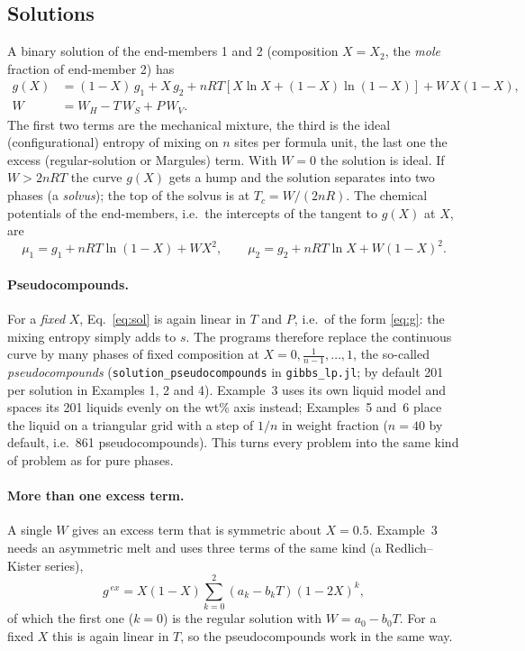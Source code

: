 \documentclass[11pt,a4paper]{article}
\newcommand{\file}[1]{\texttt{#1}}
\begin{document}
\subsection{Solutions}
A binary solution of the end-members 1 and 2 (composition $X = X_2$, the \emph{mole} fraction of
end-member 2) has
\begin{equation}\label{eq:sol}
\begin{aligned}
  g(X) &= (1-X)\,g_1 + X\,g_2 + n R T\left[X\ln X + (1-X)\ln(1-X)\right] + W\,X(1-X),\\
  W &= W_H - T\,W_S + P\,W_V .
\end{aligned}
\end{equation}
The first two terms are the mechanical mixture, the third is the ideal (configurational) entropy of mixing
on $n$ sites per formula unit, the last one the excess (regular-solution or Margules) term. With $W=0$ the
solution is ideal. If $W > 2nRT$ the curve $g(X)$ gets a hump and the solution separates into two phases
(a \emph{solvus}); the top of the solvus is at $T_c = W/(2nR)$. The chemical potentials of the end-members,
i.e.\ the intercepts of the tangent to $g(X)$ at $X$, are
\begin{equation}\label{eq:mu}
  \mu_1 = g_1 + nRT\ln(1-X) + W X^2,\qquad \mu_2 = g_2 + nRT\ln X + W(1-X)^2 .
\end{equation}

\paragraph{Pseudocompounds.} For a \emph{fixed} $X$, Eq.~\eqref{eq:sol} is again linear in $T$ and $P$, i.e.\ of
the form \eqref{eq:g}: the mixing entropy simply adds to $s$. The programs therefore replace the continuous
curve by many phases of fixed composition at $X = 0, \tfrac{1}{n-1}, \dots, 1$, the so-called
\emph{pseudocompounds} (\lstinline{solution_pseudocompounds} in \file{gibbs\_lp.jl}; by default 201 per
solution in Examples 1, 2 and 4). Example~3 uses its own liquid model and spaces its 201 liquids evenly on
the wt\% axis instead; Examples~5 and~6 place the liquid on a triangular grid with a step of $1/n$ in weight
fraction ($n = 40$ by default, i.e.\ 861 pseudocompounds).
This turns every problem into the same kind of problem as for pure phases.

\paragraph{More than one excess term.} A single $W$ gives an excess term that is symmetric about $X = 0.5$.
Example~3 needs an asymmetric melt and uses three terms of the same kind (a Redlich–Kister series),
\begin{equation}\label{eq:rk}
  g^{\,ex} = X(1-X)\sum_{k=0}^{2} \left(a_k - b_k T\right)(1-2X)^k ,
\end{equation}
of which the first one ($k=0$) is the regular solution with $W = a_0 - b_0 T$. For a fixed $X$ this is again
linear in $T$, so the pseudocompounds work in the same way.
\end{document}
